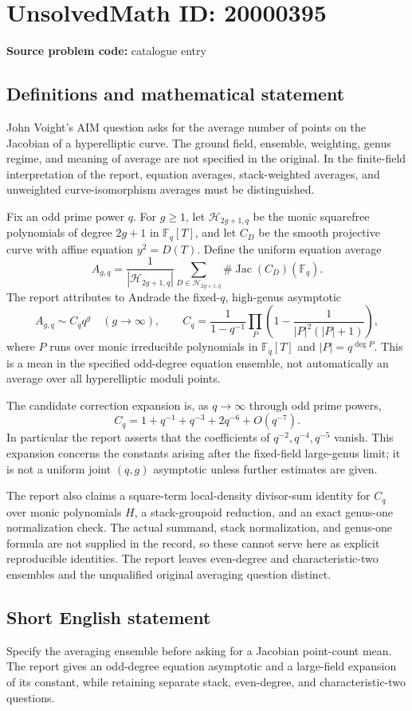 \documentclass[11pt]{article}
\newcommand{\F}{\mathbb{F}}
\begin{document}
\section*{UnsolvedMath ID: 20000395}
\textbf{Source problem code:} catalogue entry
\subsection{Definitions and mathematical statement}
John Voight's AIM question asks for the average number of points on the Jacobian of a hyperelliptic curve. The ground field, ensemble, weighting, genus regime, and meaning of average are not specified in the original. In the finite-field interpretation of the report, equation averages, stack-weighted averages, and unweighted curve-isomorphism averages must be distinguished.

Fix an odd prime power \(q\). For \(g\geq1\), let \(\mathcal H_{2g+1,q}\) be the monic squarefree polynomials of degree \(2g+1\) in \(\F_q[T]\), and let \(C_D\) be the smooth projective curve with affine equation \(y^2=D(T)\). Define the uniform equation average
\[
A_{g,q}=\frac1{|\mathcal H_{2g+1,q}|}
\sum_{D\in\mathcal H_{2g+1,q}}\#\operatorname{Jac}(C_D)(\F_q).
\]
The report attributes to Andrade the fixed-\(q\), high-genus asymptotic
\[
A_{g,q}\sim C_q q^g\quad(g\to\infty),\qquad
C_q=\frac1{1-q^{-1}}\prod_P\left(1-\frac1{|P|^2(|P|+1)}\right),
\]
where \(P\) runs over monic irreducible polynomials in \(\F_q[T]\) and \(|P|=q^{\deg P}\). This is a mean in the specified odd-degree equation ensemble, not automatically an average over all hyperelliptic moduli points.

The candidate correction expansion is, as \(q\to\infty\) through odd prime powers,
\[
C_q=1+q^{-1}+q^{-3}+2q^{-6}+O(q^{-7}).
\]
In particular the report asserts that the coefficients of \(q^{-2},q^{-4},q^{-5}\) vanish. This expansion concerns the constants arising after the fixed-field large-genus limit; it is not a uniform joint \((q,g)\) asymptotic unless further estimates are given.

The report also claims a square-term local-density divisor-sum identity for \(C_q\) over monic polynomials \(H\), a stack-groupoid reduction, and an exact genus-one normalization check. The actual summand, stack normalization, and genus-one formula are not supplied in the record, so these cannot serve here as explicit reproducible identities. The report leaves even-degree and characteristic-two ensembles and the unqualified original averaging question distinct.
\subsection{Short English statement}
Specify the averaging ensemble before asking for a Jacobian point-count mean. The report gives an odd-degree equation asymptotic and a large-field expansion of its constant, while retaining separate stack, even-degree, and characteristic-two questions.
\end{document}
